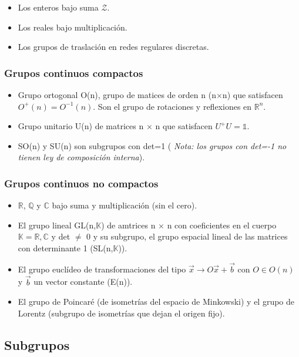 \documentclass{article}
\begin{document}
\begin{itemize}
\item Los enteros bajo suma $\mathcal{Z}$.
\item Los reales bajo multiplicación.
\item Los grupos de traslación en redes regulares discretas.
\end{itemize}

\subsubsection{Grupos continuos compactos}
\begin{itemize}
\item Grupo ortogonal O(n), grupo de matices de orden n (n$\times$n) que satisfacen $O^+(n)=O^{-1}(n)$. Son el grupo de rotaciones y reflexiones en $\mathds{R}^n$.
\item Grupo unitario U(n) de matrices n $\times$ n que satisfacen $U^+U=\mathds{1}$.
\item SO(n) y SU(n) son subgrupos con det=1 (\textit{ Nota: los grupos con det=-1 no tienen ley de composición interna}).
\end{itemize}

\subsubsection{Grupos continuos no compactos}

\begin{itemize}
\item $\mathds{R}$, $\mathds{Q}$ y $\mathds{C}$ bajo suma y multiplicación (sin el cero).
\item El grupo lineal GL(n,$\mathds{K}$) de amtrices n $\times$ n con coeficientes en el cuerpo $\mathds{K}=\mathds{R},\mathds{C}$ y det $\neq$ 0 y su subgrupo, el grupo espacial lineal de las matrices con determinante 1 (SL(n,$\mathds{K}$)).
\item El grupo euclídeo de transformaciones del tipo $\Vec{x}\rightarrow O\Vec{x}+\Vec{b}$ con $O\in O(n)$ y $\Vec{b}$ un vector constante (E(n)).
\item El grupo de Poincaré (de isometrías del espacio de Minkowski) y el grupo de Lorentz (subgrupo de isometrías que dejan el origen fijo).
\end{itemize}

\subsection{Subgrupos}
\end{document}
